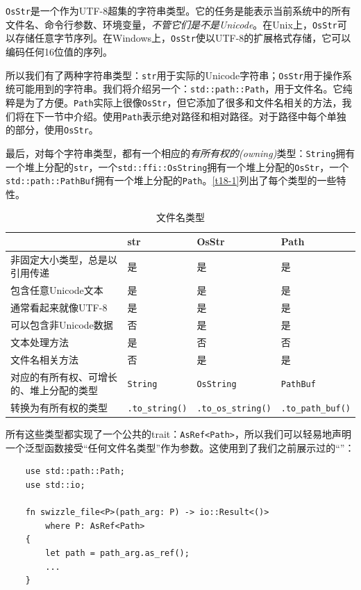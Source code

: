 \texttt{OsStr}是一个作为UTF-8超集的字符串类型。它的任务是能表示当前系统中的所有文件名、命令行参数、环境变量，\emph{不管它们是不是Unicode}。在Unix上，\texttt{OsStr}可以存储任意字节序列。在Windows上，\texttt{OsStr}使以UTF-8的扩展格式存储，它可以编码任何16位值的序列。

所以我们有了两种字符串类型：\texttt{str}用于实际的Unicode字符串；\texttt{OsStr}用于操作系统可能用到的字符串。我们将介绍另一个：\texttt{std::path::Path}，用于文件名。它纯粹是为了方便。\texttt{Path}实际上很像\texttt{OsStr}，但它添加了很多和文件名相关的方法，我们将在下一节中介绍。使用\texttt{Path}表示绝对路径和相对路径。对于路径中每个单独的部分，使用\texttt{OsStr}。

最后，对每个字符串类型，都有一个相应的\emph{有所有权的(owning)}类型：\texttt{String}拥有一个堆上分配的\texttt{str}，一个\texttt{std::ffi::OsString}拥有一个堆上分配的\texttt{OsStr}，一个\texttt{std::path::PathBuf}拥有一个堆上分配的\texttt{Path}。\autoref{t18-1}列出了每个类型的一些特性。

\begin{table}[htbp]
    \centering
    \caption{文件名类型}
    \label{t18-1}
    \begin{tabular}{llll}
        \hline
        & \textbf{str} & \textbf{OsStr} & \textbf{Path} \\
        \hline
        非固定大小类型，总是以引用传递 & 是 & 是 & 是 \\
        \rowcolor{tablecolor}
        包含任意Unicode文本 & 是 & 是 & 是 \\
        通常看起来就像UTF-8 & 是 & 是 & 是 \\
        \rowcolor{tablecolor}
        可以包含非Unicode数据 & 否 & 是 & 是 \\
        文本处理方法    & 是 & 否 & 否 \\
        \rowcolor{tablecolor}
        文件名相关方法  & 否 & 是 & 是 \\
        对应的有所有权、可增长的、堆上分配的类型 & \texttt{String} & \texttt{OsString} & \texttt{PathBuf} \\
        \rowcolor{tablecolor}
        转换为有所有权的类型  & \texttt{.to\_string()} & \texttt{.to\_os\_string()} & \texttt{.to\_path\_buf()} \\
    \end{tabular}
\end{table}

所有这些类型都实现了一个公共的trait：\texttt{AsRef<Path>}，所以我们可以轻易地声明一个泛型函数接受“任何文件名类型”作为参数。这使用到了我们之前展示过的“”：
\begin{verbatim}
    use std::path::Path;
    use std::io;

    fn swizzle_file<P>(path_arg: P) -> io::Result<()>
        where P: AsRef<Path>
    {
        let path = path_arg.as_ref();
        ...
    }
\end{verbatim}


